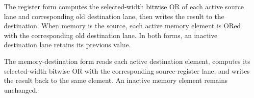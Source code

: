 The register form computes the selected-width bitwise OR of each active source
lane and corresponding old destination lane, then writes the result to the
destination. When memory is the source, each active memory element is ORed with
the corresponding old destination lane. In both forms, an inactive destination
lane retains its previous value.

The memory-destination form reads each active destination element, computes its
selected-width bitwise OR with the corresponding source-register lane, and
writes the result back to the same element. An inactive memory element remains
unchanged.
